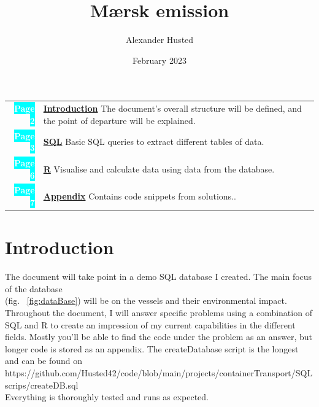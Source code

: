 \documentclass[a4paper]{article}
\title{Mærsk emission}
\author{Alexander Husted}
\date{February 2023}
\begin{document}
\maketitle

\large %
\vspace{3cm} %

\begin{center} 
{\setlength\arrayrulewidth{2pt}
\begin{tabular}{r|p{9.8cm}}
\colorbox{cyan}{\textcolor{white}{\bf Page 2}}      
& \textbf{\underline{Introduction}} \: The document's overall structure will be defined, and the point of departure will be explained.         \\[2cm]

\colorbox{cyan}{\textcolor{white}{\bf Page 3}}       
    & \textbf{\underline{SQL}} Basic SQL queries to extract different tables of data.   \\[1cm]
\colorbox{cyan}{\textcolor{white}{\bf Page 6}}  
    & \textbf{\underline{R}} Visualise and calculate data using data from the database.     \\[2cm]
\colorbox{cyan}{\textcolor{white}{\bf Page 7}}  
    &	\underline{\textbf{Appendix}} Contains code snippets from solutions..  \\[2cm]

\end{tabular}}
\end{center}
\normalsize
\newpage
\section{Introduction}
\begin{flushleft}
    The document will take point in a demo SQL database I created.   The main focus of the database \\
    (fig. ~\ref{fig:dataBase}) will be on the vessels and their environmental impact. Throughout the document, I will answer specific problems using a combination of SQL and R to create an impression of my current capabilities in the different fields. \newline \newline Mostly you'll be able to find the code under the problem as an answer, but longer code is stored as an appendix. The createDatabase script is the longest and can be found on https://github.com/Husted42/code/blob/main/projects/containerTransport/SQLscrips/createDB.sql \\
    Everything is thoroughly tested and runs as expected.
\end{flushleft}
 
\end{document}
